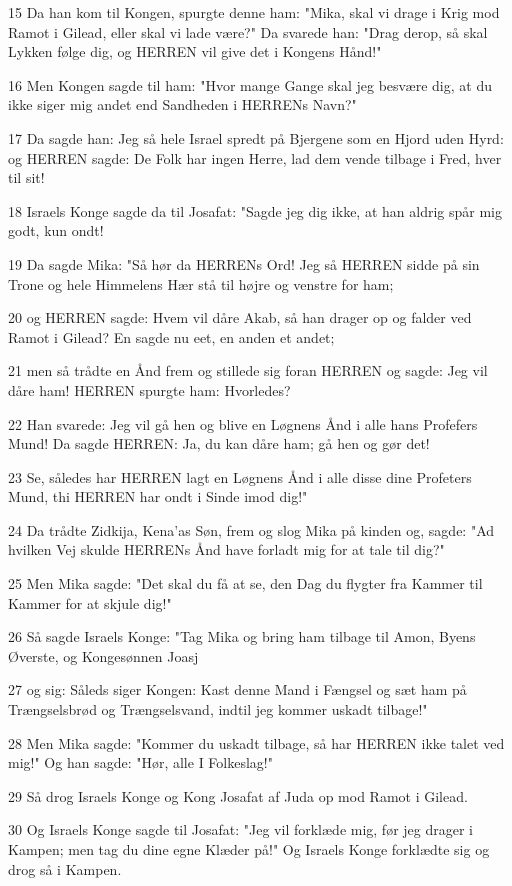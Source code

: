 \par 15 Da han kom til Kongen, spurgte denne ham: "Mika, skal vi drage i Krig mod Ramot i Gilead, eller skal vi lade være?" Da svarede han: "Drag derop, så skal Lykken følge dig, og HERREN vil give det i Kongens Hånd!"
\par 16 Men Kongen sagde til ham: "Hvor mange Gange skal jeg besvære dig, at du ikke siger mig andet end Sandheden i HERRENs Navn?"
\par 17 Da sagde han: Jeg så hele Israel spredt på Bjergene som en Hjord uden Hyrd: og HERREN sagde: De Folk har ingen Herre, lad dem vende tilbage i Fred, hver til sit!
\par 18 Israels Konge sagde da til Josafat: "Sagde jeg dig ikke, at han aldrig spår mig godt, kun ondt!
\par 19 Da sagde Mika: "Så hør da HERRENs Ord! Jeg så HERREN sidde på sin Trone og hele Himmelens Hær stå til højre og venstre for ham;
\par 20 og HERREN sagde: Hvem vil dåre Akab, så han drager op og falder ved Ramot i Gilead? En sagde nu eet, en anden et andet;
\par 21 men så trådte en Ånd frem og stillede sig foran HERREN og sagde: Jeg vil dåre ham! HERREN spurgte ham: Hvorledes?
\par 22 Han svarede: Jeg vil gå hen og blive en Løgnens Ånd i alle hans Profefers Mund! Da sagde HERREN: Ja, du kan dåre ham; gå hen og gør det!
\par 23 Se, således har HERREN lagt en Løgnens Ånd i alle disse dine Profeters Mund, thi HERREN har ondt i Sinde imod dig!"
\par 24 Da trådte Zidkija, Kena'as Søn, frem og slog Mika på kinden og, sagde: "Ad hvilken Vej skulde HERRENs Ånd have forladt mig for at tale til dig?"
\par 25 Men Mika sagde: "Det skal du få at se, den Dag du flygter fra Kammer til Kammer for at skjule dig!"
\par 26 Så sagde Israels Konge: "Tag Mika og bring ham tilbage til Amon, Byens Øverste, og Kongesønnen Joasj
\par 27 og sig: Såleds siger Kongen: Kast denne Mand i Fængsel og sæt ham på Trængselsbrød og Trængselsvand, indtil jeg kommer uskadt tilbage!"
\par 28 Men Mika sagde: "Kommer du uskadt tilbage, så har HERREN ikke talet ved mig!" Og han sagde: "Hør, alle I Folkeslag!"
\par 29 Så drog Israels Konge og Kong Josafat af Juda op mod Ramot i Gilead.
\par 30 Og Israels Konge sagde til Josafat: "Jeg vil forklæde mig, før jeg drager i Kampen; men tag du dine egne Klæder på!" Og Israels Konge forklædte sig og drog så i Kampen.
